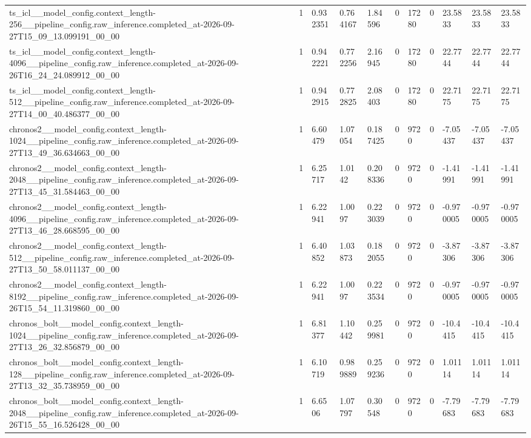 \begin{tabular}{lllllllllll}
ts\_icl\_\_model\_config.context\_length-256\_\_pipeline\_config.raw\_inference.completed\_at-2026-09-27T15\_09\_13.099191\_00\_00 & 1 & 0.932351 & 0.764167 & 1.84596 & 0 & 17280 & 0 & 23.5833 & 23.5833 & 23.5833 \\
ts\_icl\_\_model\_config.context\_length-4096\_\_pipeline\_config.raw\_inference.completed\_at-2026-09-26T16\_24\_24.089912\_00\_00 & 1 & 0.942221 & 0.772256 & 2.16945 & 0 & 17280 & 0 & 22.7744 & 22.7744 & 22.7744 \\
ts\_icl\_\_model\_config.context\_length-512\_\_pipeline\_config.raw\_inference.completed\_at-2026-09-27T14\_00\_40.486377\_00\_00 & 1 & 0.942915 & 0.772825 & 2.08403 & 0 & 17280 & 0 & 22.7175 & 22.7175 & 22.7175 \\
chronos2\_\_model\_config.context\_length-1024\_\_pipeline\_config.raw\_inference.completed\_at-2026-09-27T13\_49\_36.634663\_00\_00 & 1 & 6.60479 & 1.07054 & 0.187425 & 0 & 9720 & 0 & -7.05437 & -7.05437 & -7.05437 \\
chronos2\_\_model\_config.context\_length-2048\_\_pipeline\_config.raw\_inference.completed\_at-2026-09-27T13\_45\_31.584463\_00\_00 & 1 & 6.25717 & 1.0142 & 0.208336 & 0 & 9720 & 0 & -1.41991 & -1.41991 & -1.41991 \\
chronos2\_\_model\_config.context\_length-4096\_\_pipeline\_config.raw\_inference.completed\_at-2026-09-27T13\_46\_28.668595\_00\_00 & 1 & 6.22941 & 1.0097 & 0.223039 & 0 & 9720 & 0 & -0.970005 & -0.970005 & -0.970005 \\
chronos2\_\_model\_config.context\_length-512\_\_pipeline\_config.raw\_inference.completed\_at-2026-09-27T13\_50\_58.011137\_00\_00 & 1 & 6.40852 & 1.03873 & 0.182055 & 0 & 9720 & 0 & -3.87306 & -3.87306 & -3.87306 \\
chronos2\_\_model\_config.context\_length-8192\_\_pipeline\_config.raw\_inference.completed\_at-2026-09-26T15\_54\_11.319860\_00\_00 & 1 & 6.22941 & 1.0097 & 0.223534 & 0 & 9720 & 0 & -0.970005 & -0.970005 & -0.970005 \\
chronos\_bolt\_\_model\_config.context\_length-1024\_\_pipeline\_config.raw\_inference.completed\_at-2026-09-27T13\_26\_32.856879\_00\_00 & 1 & 6.81377 & 1.10442 & 0.259981 & 0 & 9720 & 0 & -10.4415 & -10.4415 & -10.4415 \\
chronos\_bolt\_\_model\_config.context\_length-128\_\_pipeline\_config.raw\_inference.completed\_at-2026-09-27T13\_32\_35.738959\_00\_00 & 1 & 6.10719 & 0.989889 & 0.259236 & 0 & 9720 & 0 & 1.01114 & 1.01114 & 1.01114 \\
chronos\_bolt\_\_model\_config.context\_length-2048\_\_pipeline\_config.raw\_inference.completed\_at-2026-09-26T15\_55\_16.526428\_00\_00 & 1 & 6.6506 & 1.07797 & 0.30548 & 0 & 9720 & 0 & -7.79683 & -7.79683 & -7.79683 \\

\end{tabular}
